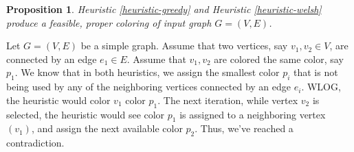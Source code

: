 \documentclass{article}
\newcounter{heuristic} \setcounter{heuristic}{0}
\newtheorem{prop}{Proposition}
\theoremstyle{definition}
\begin{document}
\begin{prop}
Heuristic \ref{heuristic-greedy} and Heuristic \ref{heuristic-welsh} produce a feasible, proper coloring of input graph \(G = (V, E)\).
\end{prop}

Let \(G = (V, E)\) be a simple graph. Assume that two vertices, say \(v_1, v_2 \in V\), are connected by an edge \(e_1 \in E\). Assume that \(v_1, v_2\) are colored the same color, say \(p_1\). We know that in both heuristics, we assign the smallest color \(p_i\) that is not being used by any of the neighboring vertices connected by an edge \(e_i\). WLOG, the heuristic would color \(v_1\) color \(p_1\). The next iteration, while vertex \(v_2\) is selected, the heuristic would see color \(p_1\) is assigned to a neighboring vertex \((v_1)\), and assign the next available color \(p_2\). Thus, we've reached a contradiction.
\end{document}
